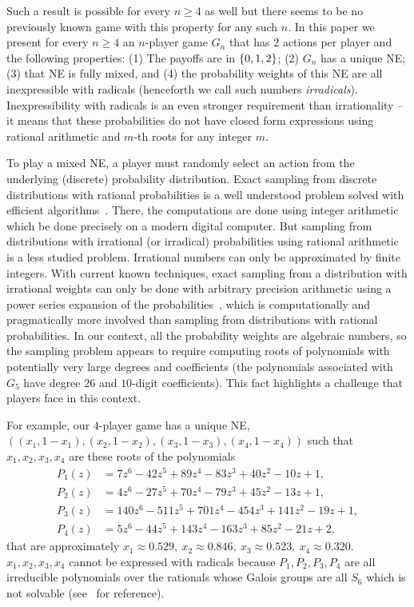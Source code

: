 \documentclass[preprint,12pt,authoryear]{elsarticle}
\DeclarePairedDelimiter{\ios}{\{}{\}}
\newcommand{\s}{\ios*}
\begin{document}
Such a result is possible for every $n\ge4$ as well but there seems to be no previously known game with this property for any such $n$.
In this paper we present for every $n\ge4$ an $n$-player game $G_n$ that has 2 actions per 
player and the following properties: (1) The payoffs are in $\s{0,1,2}$; (2) $G_n$ has a 
unique NE; (3) that NE is fully mixed, and (4) the probability weights of this NE are all 
inexpressible with radicals (henceforth we call such numbers \emph{irradicals}).  
Inexpressibility with radicals is an even stronger requirement than irrationality -- it 
means that these probabilities do not have closed form expressions using rational arithmetic and $m$-th roots for any integer $m$.

To play a mixed NE, a player must randomly select an action from the underlying (discrete) probability distribution.
Exact sampling from discrete distributions with rational probabilities is a well understood problem solved with efficient algorithms~\citep{knuth1976complexity,draper2025efficient}. There, the computations are done using integer arithmetic which be done precisely on a modern digital computer. But sampling from distributions with irrational (or irradical) probabilities using rational arithmetic is a less studied problem. Irrational numbers can only be approximated by finite integers. With current known techniques, exact sampling from a distribution with irrational weights can only be done with arbitrary precision arithmetic using a power series expansion of the probabilities~\citep{flajolet2011buffon,mendo2020simulating}, which is computationally and pragmatically more involved than sampling from distributions with rational probabilities.
In our context, all the probability weights are algebraic numbers, so the sampling problem appears to require computing roots of polynomials with potentially very large degrees and coefficients (the polynomials associated with $G_5$ have degree $26$ and $10$-digit coefficients).
This fact highlights a challenge that players face in this context.

For example, our $4$-player game has a unique NE, 
$((x_1,1-x_1),(x_2,1-x_2),(x_3,1-x_3),(x_4,1-x_4))$ such that $x_1,x_2,x_3,x_4$ are these 
roots of the polynomials
\begin{align*}
  P_1(z)&=7z^6-42z^5+89z^4-83z^3+40z^2-10z+1,\\
  P_2(z)&=4z^6-27z^5+70z^4-79z^3+45z^2-13z+1,\\
  P_3(z)&=140z^6-511z^5+701z^4-454z^3+141z^2-19z+1,\\
  P_4(z)&=5z^6-44z^5+143z^4-163z^3+85z^2-21z+2,
\end{align*}
that are approximately
$x_1\approx0.529,~x_2\approx0.846,~x_3\approx0.523,~x_4\approx0.320$. $x_1,x_2,x_3,x_4$ 
cannot be expressed with radicals because $P_1,P_2,P_3,P_4$ are all irreducible polynomials 
over the rationals whose Galois groups are all $S_6$ which is not solvable 
(see~\citet{artin2011algebra} for reference).
\end{document}

